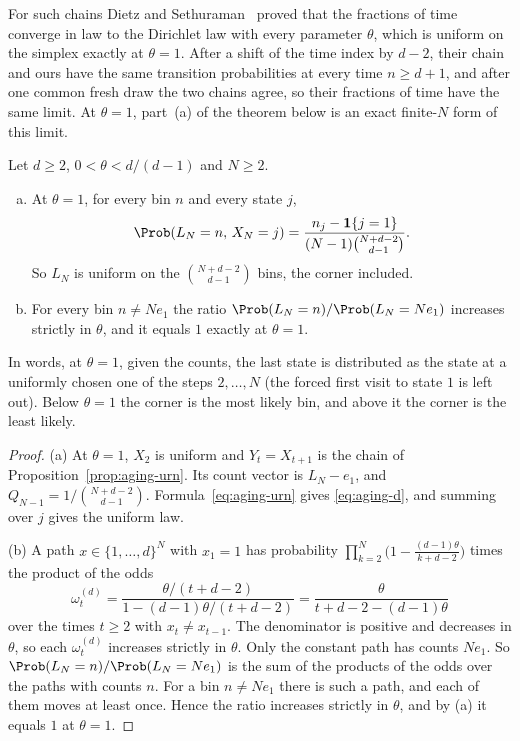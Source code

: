 For such chains Dietz and Sethuraman~\cite[Theorem~1.4]{ds2007} proved that
the fractions of time converge in law to the Dirichlet law with every
parameter $\theta$, which is uniform on the simplex exactly at $\theta=1$.
After a shift of the time index by $d-2$, their chain and ours have the same
transition probabilities at every time $n\ge d+1$, and after one common fresh
draw the two chains agree, so their fractions of time have the same limit. At
$\theta=1$, part~(a) of the theorem below is an exact finite-$N$ form of this
limit.

\begin{theorem}[$d$ states]\label{thm:aging-d}
Let $d\ge2$, $0<\theta<d/(d-1)$ and $N\ge2$.
\begin{enumerate}[(a)]
\item At $\theta=1$, for every bin $n$ and every state $j$,
\begin{equation}\label{eq:aging-d}
 \Prob(L_N=n,\,X_N=j)=\frac{n_j-\mathbf 1\{j=1\}}{(N-1)\binom{N+d-2}{d-1}} .
\end{equation}
So $L_N$ is uniform on the $\binom{N+d-2}{d-1}$ bins, the corner included.
\item For every bin $n\ne Ne_1$ the ratio $\Prob(L_N=n)/\Prob(L_N=Ne_1)$
increases strictly in $\theta$, and it equals $1$ exactly at $\theta=1$.
\end{enumerate}
\end{theorem}

In words, at $\theta=1$, given the counts, the
last state is distributed as the state at a uniformly chosen one of the steps
$2,\dots,N$ (the forced first visit to state $1$ is left out).
Below $\theta=1$ the corner is the most likely bin, and above it the corner
is the least likely.

\begin{proof}
(a) At $\theta=1$, $X_2$ is uniform and $Y_t=X_{t+1}$ is the chain
of Proposition~\ref{prop:aging-urn}. Its count vector is $L_N-e_1$, and
$Q_{N-1}=1/\binom{N+d-2}{d-1}$. Formula~\eqref{eq:aging-urn} gives
\eqref{eq:aging-d}, and summing over $j$ gives the uniform law.

(b) A path $x\in\{1,\dots,d\}^N$ with $x_1=1$ has probability
$\prod_{k=2}^N\bigl(1-\frac{(d-1)\theta}{k+d-2}\bigr)$ times the product of
the odds
\[
 \omega^{(d)}_t=\frac{\theta/(t+d-2)}{1-(d-1)\theta/(t+d-2)}
 =\frac{\theta}{t+d-2-(d-1)\theta}
\]
over the times $t\ge2$ with $x_t\ne x_{t-1}$. The denominator is positive and
decreases in $\theta$, so each $\omega^{(d)}_t$ increases strictly in
$\theta$. Only the constant path has counts $Ne_1$. So
$\Prob(L_N=n)/\Prob(L_N=Ne_1)$ is the sum of the products of the odds over
the paths with counts $n$. For a bin $n\ne Ne_1$ there is such a path, and
each of them moves at least once. Hence the ratio increases strictly in
$\theta$, and by (a) it equals $1$ at $\theta=1$.
\end{proof}


